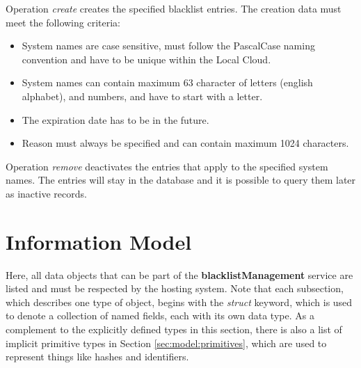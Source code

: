 \documentclass[a4paper]{arrowhead}
\begin{document}

Operation \textit{create} creates the specified blacklist entries. The creation data must meet the following criteria:

\begin{itemize}
    \item System names are case sensitive, must follow the PascalCase naming convention and have to be unique within the Local Cloud.
    \item System names can contain maximum 63 character of letters (english alphabet), and numbers, and have to start with a letter.
    \item The expiration date has to be in the future.
    \item Reason must always be specified and can contain maximum 1024 characters.
\end{itemize}


Operation \textit{remove} deactivates the entries that apply to the specified system names. The entries will stay in the database and it is possible to query them later as inactive records.

\clearpage

\section{Information Model}
\label{sec:model}

Here, all data objects that can be part of the \textbf{blacklistManagement} service are listed and must be respected by the hosting system.
Note that each subsection, which describes one type of object, begins with the \textit{struct} keyword, which is used to denote a collection of named fields, each with its own data type.
As a complement to the explicitly defined types in this section, there is also a list of implicit primitive types in Section \ref{sec:model:primitives}, which are used to represent things like hashes and identifiers.


 
\end{document}
